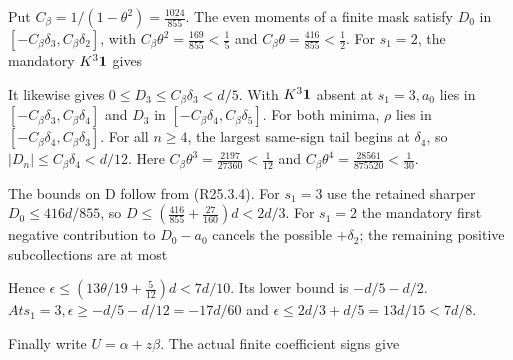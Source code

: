 Put \(C_\beta=1/(1-\theta^2)=\frac{1024}{855}\). The even moments of a finite mask satisfy \(D_0\) in \([-C_\beta \delta_3,\allowbreak \allowbreak C_\beta \delta_2]\), with \(C_\beta \theta^2=\frac{169}{855}<\frac{1}{5}\) and \(C_\beta \theta=\frac{416}{855}<\frac{1}{2}\). For \(s_{1}=2\), the mandatory \(K^3\mathbf1\) gives


It likewise gives \(0\le D_3\le C_\beta \delta_3<d/5\). With \(K^3\mathbf1\) absent at \(s_{1}=3,\allowbreak \allowbreak  a_0\) lies in \([-C_\beta \delta_3,\allowbreak \allowbreak C_\beta \delta_4]\) and \(D_3\) in \([-C_\beta \delta_4,\allowbreak \allowbreak C_\beta \delta_5]\). For both minima, \(\rho\) lies in \([-C_\beta \delta_4,\allowbreak \allowbreak C_\beta \delta_3]\). For all \(n\ge 4\), the largest same-sign tail begins at \(\delta_4\), so \(\lvert D_n\rvert \le C_\beta \delta_4<d/12\). Here \(C_\beta \theta^3=\frac{2197}{27360}<\frac{1}{12}\) and \(C_\beta \theta^4=\frac{28561}{875520}<\frac{1}{30}\).

The bounds on D follow from (R25.3.4). For \(s_{1}=3\) use the retained sharper \(D_0\le 416d/855\), so \(D\le (\frac{416}{855}+\frac{27}{160})d<2d/3\). For \(s_{1}=2\) the mandatory first negative contribution to \(D_0-a_0\) cancels the possible \(+\delta_2\); the remaining positive subcollections are at most


Hence \(\epsilon\le (13\theta/19+\frac{5}{12})d<7d/10\). Its lower bound is \(-d/5-d/2\). \(At s_{1}=3,\allowbreak \allowbreak  \epsilon\ge -d/5-d/12=-17d/60\) and \(\epsilon\le 2d/3+d/5=13d/15<7d/8\).

Finally write \(U=\alpha+z \beta\). The actual finite coefficient signs give



